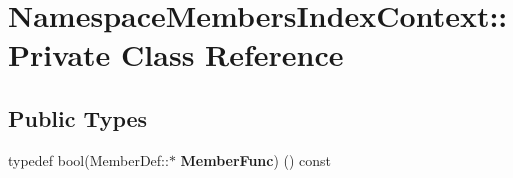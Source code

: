 \hypertarget{class_namespace_members_index_context_1_1_private}{}\section{Namespace\+Members\+Index\+Context\+::Private Class Reference}
\label{class_namespace_members_index_context_1_1_private}
\subsection*{Public Types}
\begin{DoxyCompactItemize}
\item 
\mbox{\label{class_namespace_members_index_context_1_1_private_a56e621c98b127ed4f12054c1ca570fe4}} 
typedef bool(Member\+Def\+::$\ast$ {\bfseries Member\+Func}) () const
\end{DoxyCompactItemize}
